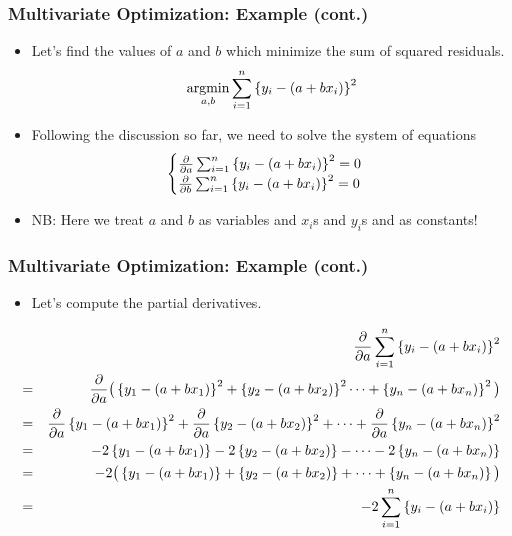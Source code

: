\documentclass[pdflatex, 12pt]{beamer}
\begin{document}
\begin{frame}
\frametitle{Multivariate Optimization: Example (cont.)}
\begin{itemize}
\item Let's find the values of $a$ and $b$ which minimize the sum of squared residuals.
 \begin{equation}
 \operatorname*{argmin}_{a, b} \sum_{i = 1}^{n} \left\{y_i - (a + bx_i)\right\}^2 \notag
 \end{equation}
\item Following the discussion so far, we need to solve the system of equations
 \begin{eqnarray}
 \begin{cases}
 \frac{\partial}{\partial a} \sum_{i = 1}^{n} \left\{y_i - (a + bx_i)\right\}^2 = 0 \\
 \frac{\partial}{\partial b} \sum_{i = 1}^{n} \left\{y_i - (a + bx_i)\right\}^2 = 0 \notag
 \end{cases}
 \end{eqnarray}
\item NB: Here we treat $a$ and $b$ as variables and $x_i$s and $y_i$s and as constants!
\end{itemize}
\end{frame}

\begin{frame}
\frametitle{Multivariate Optimization: Example (cont.)}
\begin{itemize}
\item Let's compute the partial derivatives.
\end{itemize}
{\footnotesize
\begin{eqnarray}
&& \frac{\partial}{\partial a} \sum_{i = 1}^{n} \left\{y_i - (a + bx_i)\right\}^2 \notag \\
&=& \frac{\partial}{\partial a} \big(\left\{y_1 - (a + bx_1)\right\}^2 + \left\{y_2 - (a + bx_2)\right\}^2 \cdots + \left\{y_n - (a + bx_n)\right\}^2 \big) \notag \\
&=& \frac{\partial}{\partial a} \left\{y_1 - (a + bx_1)\right\}^2 + \frac{\partial}{\partial a} \left\{y_2 - (a + bx_2)\right\}^2 + \cdots + \frac{\partial}{\partial a} \left\{y_n - (a + bx_n)\right\}^2 \notag \\
&=& -2\left\{y_1 - (a + bx_1)\right\} - 2\left\{y_2 - (a + bx_2)\right\} - \cdots - 2\left\{y_n - (a + bx_n)\right\} \notag \\
&=& -2\big(\left\{y_1 - (a + bx_1)\right\} + \left\{y_2 - (a + bx_2)\right\} + \cdots + \left\{y_n - (a + bx_n)\right\}\big) \notag \\
&=& -2 \sum_{i = 1}^{n} \left\{y_i - (a + bx_i)\right\} \notag
\end{eqnarray}
}
\end{frame}
\end{document}
